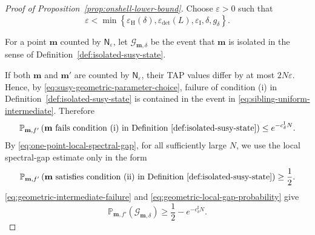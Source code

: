\documentclass[a4paper,10pt,reqno]{amsart}
\numberwithin{equation}{section}
\newcommand{\ve}{\varepsilon}
\newcommand{\dP}{\mathbb{P}}%
\newcommand{\bfm}{\mathbf{m}}
\begin{document}
\begin{proof}[Proof of Proposition~\ref{prop:onshell-lower-bound}]
		Choose \(\ve>0\) such that
		\begin{equation}\label{eq:susy-geometric-parameter-choice}
			\ve
			<
			\min\left\{
			\ve_{\mathrm H}(\delta),\ve_{\det}(L),
			\ve_{\mathrm I},
			\delta,g_\delta
			\right\}.
		\end{equation}
		
		For a point \(\bfm\) counted by \(\mathsf N_\ve\), let
		\(\mathcal G_{\bfm,\delta}\) be the event that \(\bfm\) is isolated in
		the sense of Definition~\ref{def:isolated-susy-state}.
		
		If both \(\bfm\) and \(\bfm'\) are counted by
		\(\mathsf N_\ve\), their TAP values differ by at most
		\(2N\ve\). Hence, by
		\eqref{eq:susy-geometric-parameter-choice}, failure of condition
		\textup{(i)} in Definition~\ref{def:isolated-susy-state} is contained
		in the event in \eqref{eq:sibling-uniform-intermediate}. Therefore
		\begin{equation}\label{eq:geometric-intermediate-failure}
			\dP_{\bfm,f'}\left(
			\bfm\text{ fails condition \textup{(i)} in
				Definition~\ref{def:isolated-susy-state}}
			\right)
			\le e^{-c_\delta^{\mathrm I}N}.
		\end{equation}
		By \eqref{eq:one-point-local-spectral-gap}, for all sufficiently
		large \(N\), we use the local spectral-gap estimate only in the form
		\begin{equation}\label{eq:geometric-local-gap-probability}
			\dP_{\bfm,f'}\left(
			\bfm\text{ satisfies condition \textup{(ii)} in
				Definition~\ref{def:isolated-susy-state}}
			\right)
			\ge\frac12.
		\end{equation}
		\eqref{eq:geometric-intermediate-failure} and
		\eqref{eq:geometric-local-gap-probability} give
		\begin{equation}\label{eq:geometric-good-point-probability}
			\dP_{\bfm,f'}\left(
			\mathcal G_{\bfm,\delta}
			\right)
			\ge\frac12-e^{-c_\delta^{\mathrm I}N}.
		\end{equation}
		

\end{proof}
\end{document}
